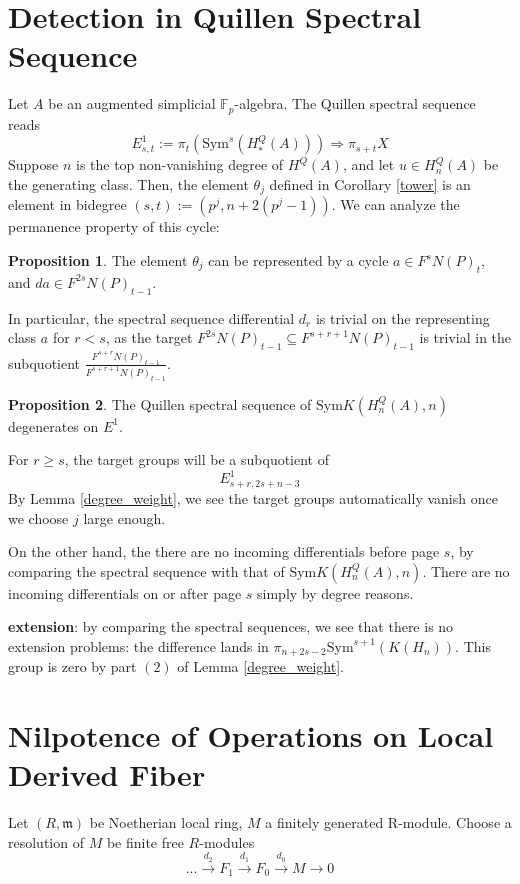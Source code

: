 \documentclass{article}
\newcommand{\Sym}{\textrm{Sym}}
\theoremstyle{definition}
\theoremstyle{definition}
\theoremstyle{definition}
\theoremstyle{definition}
\newtheorem{proposition}{Proposition}[theorem]
\theoremstyle{definition}
\theoremstyle{definition}
\theoremstyle{definition}
\theoremstyle{definition}
\begin{document}
 

\section{Detection in Quillen Spectral Sequence}
Let $A$ be an augmented simplicial $\mathbb{F}_p$-algebra. The Quillen spectral sequence reads 
\[E^1_{s,t}:= \pi_t(\Sym^s ( H^Q_*(A)) )\Rightarrow \pi_{s+t} X\]
Suppose $n$ is the top non-vanishing degree of $H^Q(A)$, and let $u\in H_n^Q(A)$ be the generating class. Then, the element $\theta_j$ defined in Corollary \ref{tower} is an element in bidegree $(s,t):=(p^j,n+2(p^j-1))$. We can analyze the permanence property of this cycle: 

\begin{proposition}
    The element $\theta_j$ can be represented by a cycle $a\in F^{s}N(P)_t$, and $da\in F^{2s}N(P)_{t-1}$.
\end{proposition}
In particular, the spectral sequence differential $d_r$ is trivial on the representing class $a$ for $r<s$, as the target $F^{2s}N(P)_{t-1}\subseteq F^{s+r+1}N(P)_{t-1}$ is trivial in the subquotient $\frac{F^{s+r}N(P)_{t-1}}{F^{s+r+1}N(P)_{t-1}}$. 

\begin{proposition}
    The Quillen spectral sequence of $\Sym K(H^Q_{n}(A),n)$ degenerates on $E^1$. 
\end{proposition}

For $r\geq s$, the target groups will be a subquotient of 
\[E^1_{s+r,2s+n-3}\]
By Lemma \ref{degree_weight}, we see the target groups automatically vanish once we choose $j$ large enough. 

On the other hand, the there are no incoming differentials before page $s$, by comparing the spectral sequence with that of $\Sym K(H^Q_{n}(A),n)$. There are no incoming differentials on or after page $s$ simply by degree reasons. 

\textbf{extension}: by comparing the spectral sequences, we see that there is no extension problems: the difference lands in $\pi_{n+2s-2} \Sym^{s+1}(K(H_n))$. This group is zero by part $(2)$ of Lemma \ref{degree_weight}. 


\section{Nilpotence of Operations on Local Derived Fiber }
Let $(R,\mathfrak{m})$ be Noetherian local ring, $M$ a finitely generated R-module. Choose a resolution of $M$ be finite free $R$-modules 
\[...\xrightarrow{d_2}F_1\xrightarrow{d_1}F_0\xrightarrow{d_0}M\to 0\]
\end{document}
